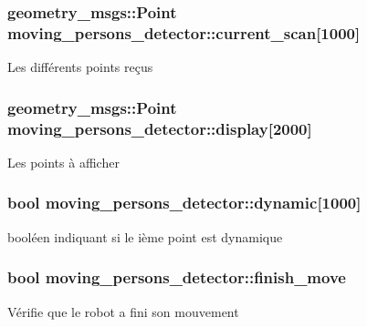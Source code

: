 \subsubsection[{\texorpdfstring{current\+\_\+scan}{current_scan}}]{\setlength{\rightskip}{0pt plus 5cm}geometry\+\_\+msgs\+::\+Point moving\+\_\+persons\+\_\+detector\+::current\+\_\+scan\mbox{[}1000\mbox{]}\hspace{0.3cm}{\ttfamily [private]}}\hypertarget{classmoving__persons__detector_a8e17523454477a9e7ed1e87c9f42816b}{}\label{classmoving__persons__detector_a8e17523454477a9e7ed1e87c9f42816b}
Les différents points reçus 
\subsubsection[{\texorpdfstring{display}{display}}]{\setlength{\rightskip}{0pt plus 5cm}geometry\+\_\+msgs\+::\+Point moving\+\_\+persons\+\_\+detector\+::display\mbox{[}2000\mbox{]}\hspace{0.3cm}{\ttfamily [private]}}\hypertarget{classmoving__persons__detector_a7a74890a878182e5e70a7a72feb6b648}{}\label{classmoving__persons__detector_a7a74890a878182e5e70a7a72feb6b648}
Les points à afficher 
\subsubsection[{\texorpdfstring{dynamic}{dynamic}}]{\setlength{\rightskip}{0pt plus 5cm}bool moving\+\_\+persons\+\_\+detector\+::dynamic\mbox{[}1000\mbox{]}\hspace{0.3cm}{\ttfamily [private]}}\hypertarget{classmoving__persons__detector_a32f205edd674741153028305da0103a2}{}\label{classmoving__persons__detector_a32f205edd674741153028305da0103a2}
booléen indiquant si le ième point est dynamique 
\subsubsection[{\texorpdfstring{finish\+\_\+move}{finish_move}}]{\setlength{\rightskip}{0pt plus 5cm}bool moving\+\_\+persons\+\_\+detector\+::finish\+\_\+move\hspace{0.3cm}{\ttfamily [private]}}\hypertarget{classmoving__persons__detector_ab9eaeb335101abe8964220a7f41fdcab}{}\label{classmoving__persons__detector_ab9eaeb335101abe8964220a7f41fdcab}
Vérifie que le robot a fini son mouvement 
